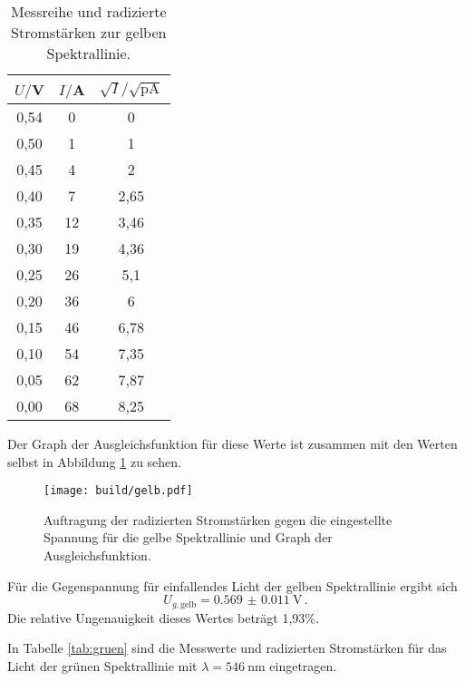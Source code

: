 \begin{table}[htp]
        \begin{center}
          \caption{Messreihe und radizierte Stromstärken zur gelben Spektrallinie.}
          \label{tab:gelb}
                \begin{tabular}{ScS}
                \toprule
                        {$U/$V} & {$I/$A} & {$\sqrt{I}/\mathrm{\sqrt{pA}}$}\\
                        ,54 &  0 & 0\\
                        0,50 &  1 & 1\\
                        0,45 &  4 & 2\\
                        0,40 &  7 & 2,65\\
                        0,35 & 12 & 3,46\\
                        0,30 & 19 & 4,36\\
                        0,25 & 26 & 5,1\\
                        0,20 & 36 & 6\\
                        0,15 & 46 & 6,78\\
                        0,10 & 54 & 7,35\\
                        0,05 & 62 & 7,87\\
                        0,00 & 68 & 8,25\\
                \bottomrule
                \end{tabular}
        \end{center}
\end{table}

Der Graph der Ausgleichsfunktion für diese Werte ist zusammen mit den Werten selbst
in Abbildung \ref{fig:gelb} zu sehen.

\begin{figure}
  \centering
  \texttt{[image: build/gelb.pdf]}
  \caption{Auftragung der radizierten Stromstärken gegen die eingestellte Spannung für die gelbe Spektrallinie und Graph der Ausgleichsfunktion.}
  \label{fig:gelb}
\end{figure}

Für die Gegenspannung für einfallendes Licht der gelben Spektrallinie ergibt sich
\begin{equation}
  U_{g,\text{gelb}} = \SI{0.569(0011)}{\volt}\,.
\end{equation}
Die relative Ungenauigkeit dieses Wertes beträgt 1,93\%.

In Tabelle \ref{tab:gruen} sind die Messwerte und radizierten Stromstärken
für das Licht der grünen Spektrallinie mit $\lambda = \SI{546}{\nano\meter}$
eingetragen.

